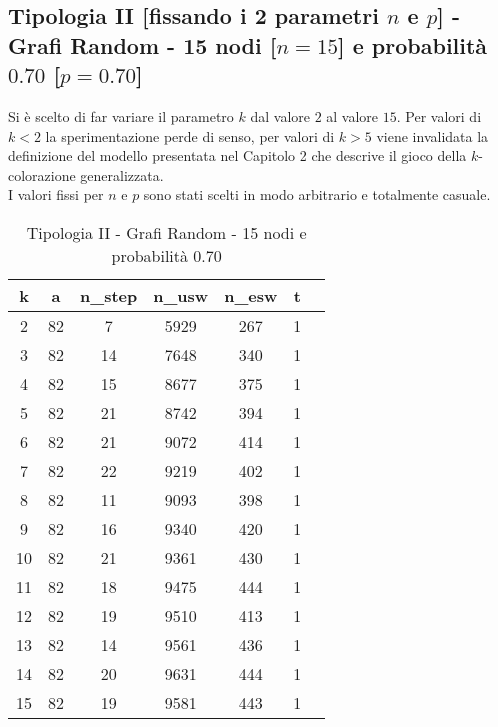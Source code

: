 \newpage
\subsection{Tipologia II [fissando i 2 parametri $n$ e $p$] - Grafi Random - 15 nodi [$n=15$] e probabilità $0.70$ [$p=0.70$]}
Si è scelto di far variare il parametro $k$ dal valore $2$ al valore $15$. Per valori di \(k<2\) la sperimentazione perde di senso, per valori di \(k>5\) viene invalidata la definizione del modello presentata nel Capitolo 2 che descrive il gioco della \(k\)-colorazione generalizzata.\\
I valori fissi per $n$ e $p$ sono stati scelti in modo arbitrario e totalmente casuale.

\begin{table}[H]
\centering
\begin{tabular}{|c|c|c|c|c|c|c|}
\hline
\textbf{k} & \textbf{a} & \textbf{n\_step} & \textbf{n\_usw} & \textbf{n\_esw} & \textbf{t} \\ \hline
2 & 82 & 7 & 5929 & 267 & 1 \\ \hline
3 & 82 & 14 & 7648 & 340 & 1 \\ \hline
4 & 82 & 15 & 8677 & 375 & 1 \\ \hline
5 & 82 & 21 & 8742 & 394 & 1 \\ \hline
6 & 82 & 21 & 9072 & 414 & 1 \\ \hline
7 & 82 & 22 & 9219 & 402 & 1 \\ \hline
8 & 82 & 11 & 9093 & 398 & 1 \\ \hline
9 & 82 & 16 & 9340 & 420 & 1 \\ \hline
10 & 82 & 21 & 9361 & 430 & 1 \\ \hline
11 & 82 & 18 & 9475 & 444 & 1 \\ \hline
12 & 82 & 19 & 9510 & 413 & 1 \\ \hline
13 & 82 & 14 & 9561 & 436 & 1 \\ \hline
14 & 82 & 20 & 9631 & 444 & 1 \\ \hline
15 & 82 & 19 & 9581 & 443 & 1 \\ \hline
\end{tabular}
\caption{Tipologia II - Grafi Random - 15 nodi e probabilità $0.70$}
\label{tab:sperimentazione-tipo1-15nodi070probab}
\end{table}

\newpage
